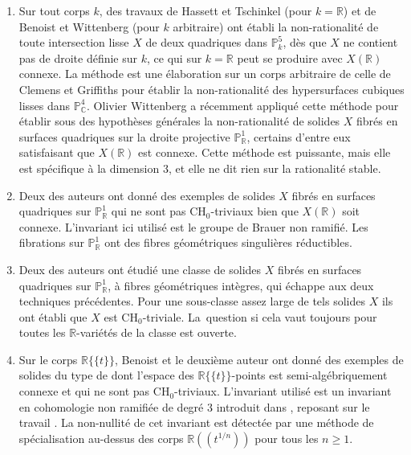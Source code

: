 \documentclass[11pt]{article}
\newcommand{\CH}{\mathrm{CH}}
\theoremstyle{definition}
\newcommand{\C}{\mathbb C}
\newcommand{\R}{\mathbb R}
\renewcommand{\P}{\mathbb P}
\newcommand{\puiseux}{\mathbb{R}\{\!\{t\}\!\}}
\begin{document}
\begin{enumerate}
\item Sur tout corps $k$, des travaux de Hassett et Tschinkel \cite{hassett2021rationality} (pour $k=\R$) et de Benoist et Wittenberg \cite{benoist2019intermediate} (pour $k$ arbitraire) ont établi
la non-rationalité de toute intersection lisse $X$ de deux quadriques
dans $\P^5_{k}$, dès que $X$ ne contient
pas de droite définie sur $k$, ce qui sur $k=\R$ peut se produire avec $X(\R)$ connexe.
La méthode est une élaboration sur un corps arbitraire de celle de Clemens et
Griffiths pour établir la non-rationalité des hypersurfaces cubiques lisses dans $\P^4_{\C}$.
Olivier Wittenberg a récemment appliqué cette méthode pour établir sous des hypothèses générales la non-rationalité
de solides $X$ fibrés en surfaces quadriques sur la droite projective $\P^1_{\R}$, certains d'entre eux satisfaisant que $X(\R)$ est connexe. Cette méthode est puissante, mais elle est spécifique à la dimension $3$, et elle ne dit rien sur la rationalité stable.

\item Deux des auteurs \cite{colliot2024certaines} ont donné des exemples de solides $X$ fibrés en surfaces quadriques sur $\P^1_{\R}$
qui ne sont pas $\CH_{0}$-triviaux bien que $X(\R)$
soit connexe. L'invariant ici utilisé est le groupe de Brauer non ramifié.
Les fibrations sur $\P^1_{\R}$ ont des fibres géométriques singulières réductibles.
\item Deux des auteurs \cite{colliot2024certaines} ont étudié une classe de
solides $X$ fibrés en surfaces quadriques sur $\P^1_{\R}$, à fibres géométriques intègres, qui échappe aux deux techniques précédentes. Pour une sous-classe assez large de tels solides $X$ ils ont établi
que $X$ est $\CH_{0}$-triviale. La~question si cela vaut toujours pour toutes les $\R$-variétés de la classe est ouverte.
\item Sur le corps $\puiseux$, Benoist et le deuxième auteur \cite{benoist2026rationality} ont donné
des exemples de solides du type de \cite{colliot2024certaines}
dont l'espace des $\puiseux$-points est semi-algébriquement connexe et
qui ne sont pas $\CH_{0}$-triviaux. L'invariant utilisé
est un invariant en cohomologie non ramifiée de degré $3$ introduit dans \cite{colliot2024certaines}, reposant sur le travail \cite{colliot1993groupe}.
La non-nullité de cet invariant est détectée par
une méthode de spécialisation au-dessus des corps
$\R(\!(t^{1/n})\!)$ pour tous les $n\geq 1$.
\end{enumerate}
\end{document}
